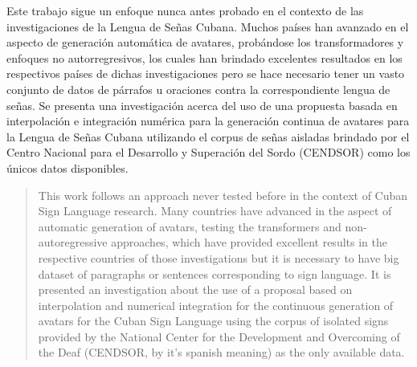 \begin{resumen}
Este trabajo sigue un enfoque nunca antes probado en el contexto de las investigaciones de la Lengua de Señas Cubana. Muchos países han avanzado en el aspecto de generación automática de avatares, probándose los transformadores y enfoques no autorregresivos, los cuales han brindado excelentes resultados en los respectivos países de dichas investigaciones pero se hace necesario tener un vasto conjunto de datos de párrafos u oraciones contra la correspondiente lengua de señas.  Se presenta una investigación acerca del uso de una propuesta basada en interpolación e integración numérica para la generación continua de avatares para la Lengua de Señas Cubana utilizando el corpus de señas aisladas brindado por el Centro Nacional para el Desarrollo y Superación del Sordo (CENDSOR) como los únicos datos disponibles.
	
\end{resumen}

\begin{abstract}
This work follows an approach never tested before in the context of Cuban Sign Language research. Many countries have advanced in the aspect of automatic generation of avatars, testing the transformers and non-autoregressive approaches, which have provided excellent results in the respective countries of those investigations but it is necessary to have big dataset of paragraphs or sentences corresponding to sign language. It is presented an investigation  about the use of a proposal based on interpolation and numerical integration for the continuous generation of avatars for the Cuban Sign Language using the corpus of isolated signs provided by the National Center for the Development and Overcoming of the Deaf (CENDSOR, by it's spanish meaning) as the only available data.
	
\end{abstract}